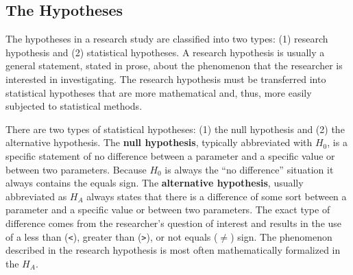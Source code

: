 \documentclass[10pt,openany]{book}\usepackage[]{graphicx}\usepackage[]{color}
\begin{document}
\subsection{The Hypotheses} \label{sec:Hypotheses}
The hypotheses in a research study are classified into two types: (1) research hypothesis and (2) statistical hypotheses.  A research hypothesis is usually a general statement, stated in prose, about the phenomenon that the researcher is interested in investigating.  The research hypothesis must be transferred into statistical hypotheses that are more mathematical and, thus, more easily subjected to statistical methods.


\vspace{-12pt}

There are two types of statistical hypotheses: (1) the null hypothesis and (2) the alternative hypothesis.  The \textbf{null hypothesis}, typically abbreviated with $H_{0}$, is a specific statement of no difference between a parameter and a specific value or between two parameters.  Because $H_{0}$ is always the ``no difference'' situation it always contains the equals sign.  The \textbf{alternative hypothesis}, usually abbreviated as $H_{A}$ always states that there is a difference of some sort between a parameter and a specific value or between two parameters.  The exact type of difference comes from the researcher's question of interest and results in the use of a less than (\verb"<"), greater than (\verb">"), or not equals ($\neq$) sign.  The phenomenon described in the research hypothesis is most often mathematically formalized in the $H_{A}$.


\vspace{-12pt}

\vspace{-12pt}
\end{document}
